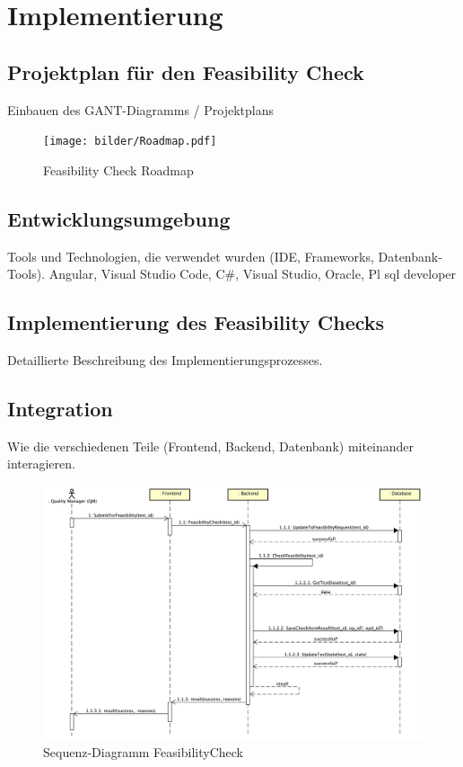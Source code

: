 \chapter{Implementierung}\label{Chap:Implementierung}

\section{Projektplan für den Feasibility Check}
Einbauen des GANT-Diagramms / Projektplans


\begin{figure}[!h]
    \centering
    \texttt{[image: bilder/Roadmap.pdf]}
    \caption{Feasibility Check Roadmap}
    \label{fig:roadmap}
\end{figure}
\section{Entwicklungsumgebung}
Tools und Technologien, die verwendet wurden (IDE, Frameworks, Datenbank-Tools).
Angular, Visual Studio Code, 
C\#, Visual Studio,
Oracle, Pl sql developer

\section{Implementierung des Feasibility Checks}
Detaillierte Beschreibung des Implementierungsprozesses.
\section{Integration}
Wie die verschiedenen Teile (Frontend, Backend, Datenbank) miteinander interagieren.

\begin{figure}[!h]
    \centering
    \includegraphics[width=1\textwidth]{bilder/Sequence-Integration.png}
    \caption{Sequenz-Diagramm FeasibilityCheck}
    \label{fig:sequence-diagram}
\end{figure}
